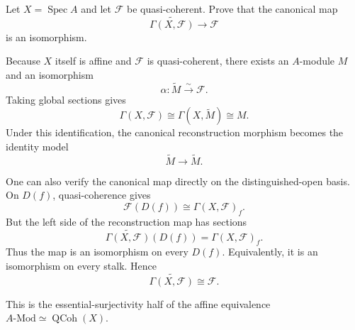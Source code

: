 \begin{problem}\label{prob:vi33-01}
Let \(X=\operatorname{Spec}A\) and let \(\mathcal F\) be quasi-coherent. Prove that the canonical map
\[
\widetilde{\Gamma(X,\mathcal F)}\longrightarrow\mathcal F
\]
is an isomorphism.
\end{problem}

\ifdefined\FullProblemDossiers
\begin{solution}
Because \(X\) itself is affine and \(\mathcal F\) is quasi-coherent, there exists an \(A\)-module \(M\) and an
isomorphism
\[
\alpha:\widetilde M\xrightarrow{\sim}\mathcal F.
\]
Taking global sections gives
\[
\Gamma(X,\mathcal F)
\cong
\Gamma(X,\widetilde M)
\cong
M.
\]
Under this identification, the canonical reconstruction morphism becomes the identity model
\[
\widetilde M\longrightarrow\widetilde M.
\]

One can also verify the canonical map directly on the distinguished-open basis.  On \(D(f)\),
quasi-coherence gives
\[
\mathcal F(D(f))
\cong
\Gamma(X,\mathcal F)_f.
\]
But the left side of the reconstruction map has sections
\[
\widetilde{\Gamma(X,\mathcal F)}(D(f))
=
\Gamma(X,\mathcal F)_f.
\]
Thus the map is an isomorphism on every \(D(f)\).  Equivalently, it is an isomorphism on every stalk. Hence
\[
\boxed{\widetilde{\Gamma(X,\mathcal F)}\cong\mathcal F}.
\]

This is the essential-surjectivity half of the affine equivalence
\(A\text{-}\mathrm{Mod}\simeq\operatorname{QCoh}(X)\).
\end{solution}
\fi

